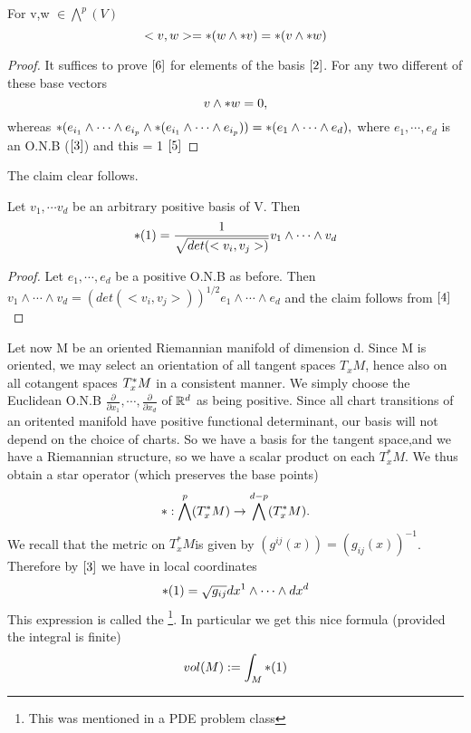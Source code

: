 \begin{lem}
 For v,w $\in \bigwedge^{p}(V)$
\begin{equation}\label{6}
 <v,w> = *(w \wedge * v) = *(v \wedge * w)
\end{equation}

\begin{proof}It suffices to prove $\eqref{6}$ for elements of the basis $\eqref{2}$. For any two different of these base vectors
 \begin{equation*}
  v\wedge * w = 0,
 \end{equation*}
whereas $*(e_{i_1}\wedge \cdots \wedge e_{i_p} \wedge*(e_{i_1}\wedge \cdots \wedge e_{i_p})) = *(e_1\wedge\cdots \wedge e_d), $ where $e_1,\cdots,e_d$ is an O.N.B 
($\eqref{3}$)
and this = 1 $\eqref{5}$
\end{proof}
\end{lem}
The claim clear follows. 
\begin{lem}
 Let $v_1,\cdots v_d$ be an arbitrary positive basis of V. Then
\begin{equation}\label{7}
 *(1) = \frac{1}{\sqrt{det(<v_i,v_j>)}} v_1\wedge \cdots \wedge v_d
\end{equation}
\begin{proof}
 Let $e_1,\cdots,e_d$ be a positive O.N.B as before. Then
$v_1\wedge \cdots \wedge v_d = (det(<v_i,v_j>))^{1/2}e_1\wedge \cdots \wedge e_d$
and the claim follows from $\eqref{4}$
\end{proof}

\end{lem}


Let now M be an oriented Riemannian manifold of dimension d. Since M is oriented, we may select an orientation of all
tangent spaces $T_{x}M$, hence also on all cotangent spaces $T^{*}_{x}M$ in a consistent manner. We simply choose the Euclidean
O.N.B $\frac{\partial}{\partial x_1},\cdots, \frac{\partial}{\partial x_d}$ of $\mathbb{R}^d$ as being positive. Since all chart 
transitions of an oritented manifold have positive functional determinant, our basis will not depend on the choice of charts.
   So we have a basis for the tangent space,and we have a Riemannian structure, so we have a scalar product on each 
$T^{*}_{x} M$. We thus obtain a star operator (which preserves the base points)
\begin{equation*}
 *: \bigwedge^p(T^{*}_{x}M) \to \bigwedge^{d-p}(T^{*}_{x}M).
\end{equation*}
   We recall that the metric on $T^{*}_{x}M$is given by $(g^{ij}(x))=(g_{ij}(x))^{-1}$. Therefore by $\eqref{3}$ we have
in local coordinates 
\begin{equation}\label{8}
 *(1) = \sqrt{g_{ij}}dx^1\wedge\cdots\wedge dx^d
\end{equation}
This expression is called the \footnote{This was mentioned in a PDE problem class}.
In particular we get this nice formula (provided the integral is finite)
\begin{equation}\label{9}
 vol(M):= \int_{M}*(1)
\end{equation}
